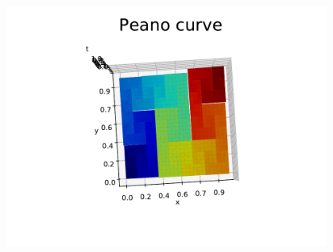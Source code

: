\documentclass[landscape,usenames,dvipsnames, 25pt]{sciposter}
\begin{document}
\begin{multicols}{3}
\begin{center}
\begin{minipage}{0.24\columnwidth}
\end{minipage}
\begin{minipage}{0.24\columnwidth}
\centering
   \includegraphics[height=8cm]{FA20/images/fractals/peano-l3-2.pdf}
\end{minipage}
\end{center}  






{
\footnotesize



}
\end{multicols}
\end{document}
